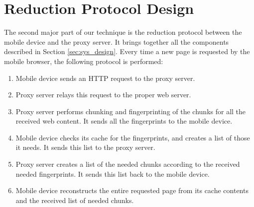 \section{Reduction Protocol Design}
\label{sec:protocol}
The second major part of our technique is the reduction protocol between the mobile device and the proxy server. It brings together all the components described in Section \ref{sec:sys_design}. Every time a new page is requested by the mobile browser, the following protocol is performed:
\begin{enumerate}
\item Mobile device sends an HTTP request to the proxy server.
\item Proxy server relays this request to the proper web server.
\item Proxy server performs chunking and fingerprinting of the chunks for all the received web content. It sends all the fingerprints to the mobile device.
\item Mobile device checks its cache for the fingerprints, and creates a list of those it needs. It sends this list to the proxy server.
\item Proxy server creates a list of the needed chunks according to the received needed fingerprints. It sends this list back to the mobile device.
\item Mobile device reconstructs the entire requested page from its cache contents and the received list of needed chunks.
\end{enumerate}




